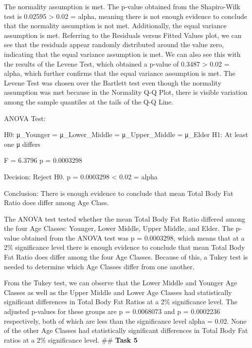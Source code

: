 \documentclass[
]{article}
\newenvironment{Shaded}{\begin{snugshade}}{\end{snugshade}}
\newcommand{\AttributeTok}[1]{\textcolor[rgb]{0.13,0.29,0.53}{#1}}
\newcommand{\FunctionTok}[1]{\textcolor[rgb]{0.13,0.29,0.53}{\textbf{#1}}}
\newcommand{\NormalTok}[1]{#1}
\newcommand{\OtherTok}[1]{\textcolor[rgb]{0.56,0.35,0.01}{#1}}
\newcommand{\SpecialCharTok}[1]{\textcolor[rgb]{0.81,0.36,0.00}{\textbf{#1}}}
\begin{document}
The normality assumption is met. The p-value obtained from the
Shapiro-Wilk test is 0.02595 \textgreater{} 0.02 = alpha, meaning there
is not enough evidence to conclude that the normality assumption is not
met. Additionally, the equal variance assumption is met. Referring to
the Residuals versus Fitted Values plot, we can see that the residuals
appear randomly distributed around the value zero, indicating that the
equal variance assumption is met. We can also see this with the results
of the Levene Test, which obtained a p-value of 0.3487 \textgreater{}
0.02 = alpha, which further confirms that the equal variance assumption
is met. The Levene Test was chosen over the Bartlett test even though
the normality assumption was met because in the Normality Q-Q Plot,
there is visible variation among the sample quantiles at the tails of
the Q-Q Line.

ANOVA Test:

H0: μ\_Younger = μ\_Lower\_Middle = μ\_Upper\_Middle = μ\_Elder H1: At
least one μ differs

F = 6.3796 p = 0.0003298

Decision: Reject H0. p = 0.0003298 \textless{} 0.02 = alpha

Conclusion: There is enough evidence to conclude that mean Total Body
Fat Ratio does differ among Age Class.

The ANOVA test tested whether the mean Total Body Fat Ratio differed
among the four Age Classes: Younger, Lower Middle, Upper Middle, and
Elder. The p-value obtained from the ANOVA test was p = 0.0003298, which
means that at a 2\% significance level there is enough evidence to
conclude that mean Total Body Fat Ratio does differ among the four Age
Classes. Because of this, a Tukey test is needed to determine which Age
Classes differ from one another.

From the Tukey test, we can observe that the Lower Middle and Younger
Age Classes as well as the Upper Middle and Lower Age Classes had
statistically significant differences in Total Body Fat Ratios at a 2\%
significance level. The adjusted p-values for these groups are p =
0.0068073 and p = 0.0002236 respectively, both of which are less than
the significance level alpha = 0.02. None of the other Age Classes had
statistically significant differences in Total Body Fat ratios at a 2\%
significance level. \#\# \textbf{Task 5}

\begin{Shaded}
\end{Shaded}
\end{document}
